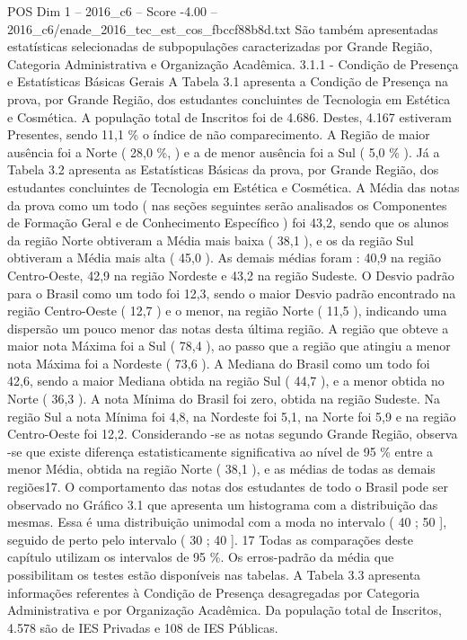\begin{textsample}{POS Dim 1 – 2016\_c6 – Score -4.00 – 2016\_c6/enade\_2016\_tec\_est\_cos\_fbccf88b8d.txt}
São também apresentadas estatísticas selecionadas de subpopulações caracterizadas por Grande Região, Categoria Administrativa e Organização Acadêmica. 3.1.1 - Condição de Presença e Estatísticas Básicas Gerais A Tabela 3.1 apresenta a Condição de Presença na prova, por Grande Região, dos estudantes concluintes de Tecnologia em Estética e Cosmética.
A população total de Inscritos foi de 4.686.
Destes, 4.167 estiveram Presentes, sendo 11,1 \% o índice de não comparecimento.
A Região de maior ausência foi a Norte ( 28,0 \%, ) e a de menor ausência foi a Sul ( 5,0 \% ).
Já a Tabela 3.2 apresenta as Estatísticas Básicas da prova, por Grande Região, dos estudantes concluintes de Tecnologia em Estética e Cosmética.
A Média das notas da prova como um todo ( nas seções seguintes serão analisados os Componentes de Formação Geral e de Conhecimento Específico ) foi 43,2, sendo que os alunos da região Norte obtiveram a Média mais baixa ( 38,1 ), e os da região Sul obtiveram a Média mais alta ( 45,0 ).
As demais médias foram : 40,9 na região Centro-Oeste, 42,9 na região Nordeste e 43,2 na região Sudeste.
O Desvio padrão para o Brasil como um todo foi 12,3, sendo o maior Desvio padrão encontrado na região Centro-Oeste ( 12,7 ) e o menor, na região Norte ( 11,5 ), indicando uma dispersão um pouco menor das notas desta última região.
A região que obteve a maior nota Máxima foi a Sul ( 78,4 ), ao passo que a região que atingiu a menor nota Máxima foi a Nordeste ( 73,6 ).
A Mediana do Brasil como um todo foi 42,6, sendo a maior Mediana obtida na região Sul ( 44,7 ), e a menor obtida no Norte ( 36,3 ).
A nota Mínima do Brasil foi zero, obtida na região Sudeste.
Na região Sul a nota Mínima foi 4,8, na Nordeste foi 5,1, na Norte foi 5,9 e na região Centro-Oeste foi 12,2.
Considerando -se as notas segundo Grande Região, observa -se que existe diferença estatisticamente significativa ao nível de 95 \% entre a menor Média, obtida na região Norte ( 38,1 ), e as médias de todas as demais regiões17.
O comportamento das notas dos estudantes de todo o Brasil pode ser observado no Gráfico 3.1 que apresenta um histograma com a distribuição das mesmas.
Essa é uma distribuição unimodal com a moda no intervalo ( 40 ; 50 ], seguido de perto pelo intervalo ( 30 ; 40 ]. 17 Todas as comparações deste capítulo utilizam os intervalos de 95 \%.
Os erros-padrão da média que possibilitam os testes estão disponíveis nas tabelas.
A Tabela 3.3 apresenta informações referentes à Condição de Presença desagregadas por Categoria Administrativa e por Organização Acadêmica.
Da população total de Inscritos, 4.578 são de IES Privadas e 108 de IES Públicas.

\end{textsample}
